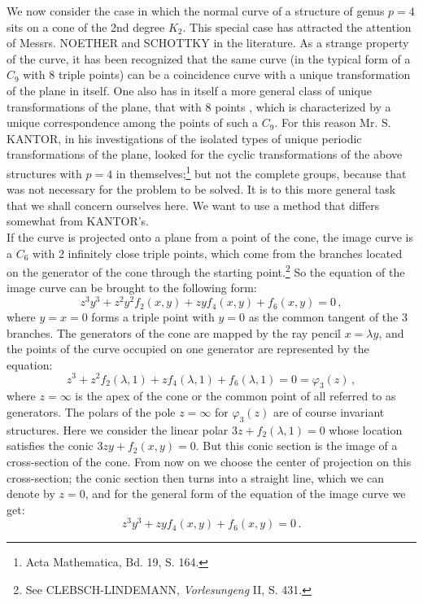 \documentclass[leqno]{article}
\begin{document}
We now consider the case in which the normal curve of a structure of genus $p=4$ sits on a cone of the 2nd degree $K_2$. This special case has attracted the attention of Messrs. NOETHER and SCHOTTKY in the literature. As a strange property of the curve, it has been recognized that the same curve (in the typical form of a $C_9$ with 8 triple points) can be a coincidence curve with a unique transformation of the plane in itself. One also has in itself a more general class of unique transformations of the plane, that \guillemotright with 8 points \guillemotright, which is characterized by a unique correspondence among the points  of such a $C_9$. For this reason Mr. S. KANTOR, in his investigations of the isolated types of unique periodic transformations of the plane, looked for the cyclic transformations of the above structures with $p=4$ in themselves;\footnote{Acta Mathematica, Bd. 19, S. 164.} but not the complete groups, because that was not necessary for the problem to be solved. It is to this more general task that we shall concern ourselves here. We want to use a method that differs somewhat from KANTOR's. \\
If the curve is projected onto a plane from a point of the cone, the image curve is a $C_6$ with 2 infinitely close triple points, which come from the branches located on the generator of the cone through the starting point.\footnote{See CLEBSCH-LINDEMANN, \textit{Vorlesungeng} II, S. 431.} So the equation of the image curve can be brought to the following form: 
\[
z^3 y^3 + z^2 y^2 f_2(x,y) + zy f_4(x,y)+ f_6(x,y) = 0 \, , 
\]
where $y=x=0$ forms a triple point with $y=0$ as the common tangent of the 3 branches. The generators of the cone are mapped by the ray pencil $x=\lambda y$, and the points of the curve occupied on one generator are represented by the equation: 
\[
z^3 + z^2 f_2(\lambda, 1) + z f_4(\lambda, 1) + f_6(\lambda, 1) = 0 = \varphi_3(z) \, , 
\] 
where $z=\infty$ is the apex of the cone or the common point of all referred to as generators. The polars of the pole $z=\infty$ for $\varphi_3(z)$ are of course invariant structures. Here we consider the linear polar $3z + f_2(\lambda, 1)=0$ whose location satisfies the conic $3zy+f_2(x,y)=0$. But this conic section is the image of a cross-section of the cone. From now on we choose the center of projection on this cross-section; the conic section then turns into a straight line, which we can denote by $z=0$, and for the general form of the equation of the image curve we get:
\begin{equation}\label{eq: 8.I}
z^3 y^3 + zy f_4(x,y) + f_6(x,y) = 0 \, . \tag{I}
\end{equation}
\end{document}
